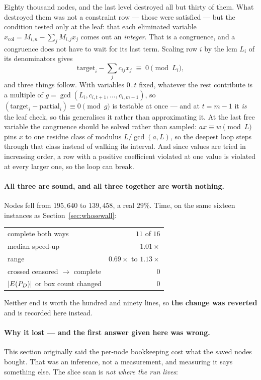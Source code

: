 \documentclass[11pt,a4paper]{article}
\begin{document}
\noindent
Eighty thousand nodes, and the last level destroyed all but thirty of them.
What destroyed them was not a constraint row --- those were satisfied --- but
the condition tested only at the leaf: that each eliminated variable
$x_{\mathrm{col}} = M_{i,n} - \sum_j M_{i,j} x_j$ comes out an \emph{integer}.
That is a congruence, and a congruence does not have to wait for its last
term.  Scaling row $i$ by the lcm $L_i$ of its denominators gives
\[
  \mathrm{target}_i - \sum_j c_{ij} x_j \;\equiv\; 0 \pmod{L_i} ,
\]
and three things follow.  With variables $0..t$ fixed, whatever the rest
contribute is a multiple of $g = \gcd(L_i, c_{i,t+1}, \dots, c_{i,m-1})$, so
$(\mathrm{target}_i - \mathrm{partial}_i) \equiv 0 \pmod{g}$ is testable at
once --- and at $t = m-1$ it \emph{is} the leaf check, so this generalises it
rather than approximating it.  At the last free variable the congruence should
be solved rather than sampled: $a x \equiv w \pmod{L}$ pins $x$ to one residue
class of modulus $L/\gcd(a,L)$, so the deepest loop steps through that class
instead of walking its interval.  And since values are tried in increasing
order, a row with a positive coefficient violated at one value is violated at
every larger one, so the loop can break.

\paragraph{All three are sound, and all three together are worth nothing.}
Nodes fell from $195{,}640$ to $139{,}458$, a real $29\%$.  Time, on the same
sixteen instances as Section~\ref{sec:whosewall}:

\begin{center}
\begin{tabular}{lr}
\toprule
complete both ways & $11$ of $16$ \\
\quad median speed-up & $\mathbf{1.01\times}$ \\
\quad range & $0.69\times$ to $1.13\times$ \\
\midrule
crossed censored $\to$ complete & $0$ \\
$|E(P_{D})|$ or box count changed & $0$ \\
\bottomrule
\end{tabular}
\end{center}

\noindent
Neither end is worth the hundred and ninety lines, so \textbf{the change was
reverted} and is recorded here instead.

\paragraph{Why it lost --- and the first answer given here was wrong.}
This section originally said the per-node bookkeeping cost what the saved
nodes bought.  That was an inference, not a measurement, and measuring it
says something else.  The slice scan is \emph{not where the run lives}:
\end{document}
